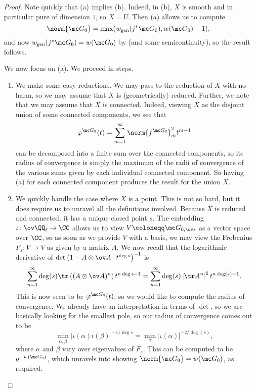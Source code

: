 \documentclass[../notes.tex]{subfiles}
\begin{document}
\begin{proof}
	Note quickly that (a) implies (b). Indeed, in (b), $X$ is smooth and in particular pure of dimension $1$, so $X=U$. Then (a) allows us to compute
	\[\norm{\mc G_0}=\max(w_{\mathrm{gen}}(j^*\mc G_0),w(\mc G_0)-1),\]
	and now $w_{\mathrm{gen}}(j^*\mc G_0)=w(\mc G_0)$ by  (and some semicontinuity), so the result follows.

	We now focus on (a). We proceed in steps.
	\begin{enumerate}
		\item We make some easy reductions. We may pass to the reduction of $X$ with no harm, so we may assume that $X$ is (geometrically) reduced. Further, we note that we may assume that $X$ is connected. Indeed, viewing $X$ as the disjoint union of some connected components, we see that
		\[\varphi^{\mc G_0}(t)=\sum_{m=1}^\infty\norm{f^{\mc G_0}}_m^2t^{m-1}\]
		can be decomposed into a finite sum over the connected components, so its radius of convergence is simply the maximum of the radii of convergence of the various sums given by each individual connected component. So having (a) for each connected component produces the result for the union $X$.

		\item We quickly handle the case where $X$ is a point. This is not so hard, but it does require us to unravel all the definitions involved. Because $X$ is reduced and connected, it has a unique closed point $s$. The embedding $\iota\colon\ov\QQ_\ell\to\CC$ allows us to view $V\coloneqq\mc G_{0,\ov s}$ as a vector space over $\CC$, so as soon as we provide $V$ with a basis, we may view the Frobenius $F_s\colon V\to V$ as given by a matrix $A$. We now recall that the logarithmic derivative of $\det\left(1-A\otimes\ov A\cdot t^{\deg s}\right)^{-1}$ is
		\[\sum_{n=1}^\infty\deg(s)\tr\left((A\otimes\ov A)^n\right)t^{n\deg s-1}=\sum_{n=1}^\infty\deg(s)\left|\tr A^n\right|^2t^{n\deg(s)-1}.\]
		This is now seen to be $\varphi^{\mc G_0}(t)$, so we would like to compute the radius of convergence. We already have an interpretation in terms of $\det$, so we are basically looking for the smallest pole, so our radius of convergence comes out to be
		\[\min_{\alpha,\beta}\left|\iota(\alpha)\iota(\beta)\right|^{-1/\deg s}=\min_{\alpha}\left|\iota(\alpha)\right|^{-2/\deg(s)},\]
		where $\alpha$ and $\beta$ vary over eigenvalues of $F_s$. This can be computed to be $q^{-w(\mc G_0)}$, which unravels into showing $\norm{\mc G_0}=w(\mc G_0)$, as required.


\end{enumerate}
\end{proof}
\end{document}
